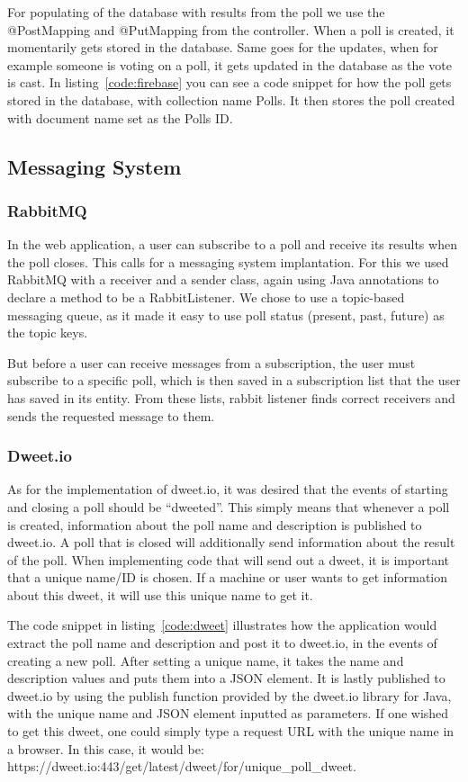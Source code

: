 \noindent For populating of the database with results from the poll we use the @PostMapping and @PutMapping from the controller. When a poll is created, it momentarily gets stored in the database. Same goes for the updates, when for example someone is voting on a poll, it gets updated in the database as the vote is cast. In listing~\ref{code:firebase} you can see a code snippet for how the poll gets stored in the database, with collection name Polls. It then stores the poll created with document name set as the Polls ID.

\subsection{Messaging System}\label{sub:messaging}
\subsubsection{RabbitMQ}
In the web application, a user can subscribe to a poll and receive its results when the poll closes. This calls for a messaging system implantation. For this we used RabbitMQ with a receiver and a sender class, again using Java annotations to declare a method to be a RabbitListener. We chose to use a topic-based messaging queue, as it made it easy to use poll status (present, past, future) as the topic keys.

But before a user can receive messages from a subscription, the user must subscribe to a specific poll, which is then saved in a subscription list that the user has saved in its entity. From these lists, rabbit listener finds correct receivers and sends the requested message to them.
\subsubsection{Dweet.io}
As for the implementation of dweet.io, it was desired that the events of starting and closing a poll should be “dweeted”. This simply means that whenever a poll is created, information about the poll name and description is published to dweet.io. A poll that is closed will additionally send information about the result of the poll. When implementing code that will send out a dweet, it is important that a unique name/ID is chosen. If a machine or user wants to get information about this dweet, it will use this unique name to get it.

The code snippet in listing~\ref{code:dweet} illustrates how the application would extract the poll name and description and post it to dweet.io, in the events of creating a new poll. After setting a unique name, it takes the name and description values and puts them into a JSON element. It is lastly published to dweet.io by using the publish function provided by the dweet.io library for Java, with the unique name and JSON element inputted as parameters. If one wished to get this dweet, one could simply type a request URL with the unique name in a browser. In this case, it would be: https://dweet.io:443/get/latest/dweet/for/unique\_poll\_dweet.


